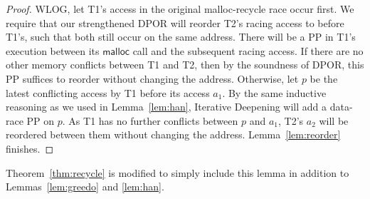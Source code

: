 \begin{proof}
WLOG, let T1's access in the original malloc-recycle race occur first.
We require that our strengthened DPOR will reorder T2's racing access to before T1's, such that both still occur on the same address.
There will be a PP in T1's execution between its $\mathsf{malloc}$ call and the subsequent racing access.
If there are no other memory conflicts between T1 and T2, then by the soundness of DPOR, this PP suffices to reorder without changing the address.
Otherwise, let $p$ be the latest conflicting access by T1 before its access $a_1$.
By the same inductive reasoning as we used in Lemma~\ref{lem:han}, Iterative Deepening will add a data-race PP on $p$.
As T1 has no further conflicts between $p$ and $a_1$, T2's $a_2$ will be reordered between them without changing the address.
Lemma~\ref{lem:reorder} finishes.
\end{proof}

Theorem~\ref{thm:recycle} is modified to simply include this lemma in addition to Lemmas~\ref{lem:greedo} and \ref{lem:han}.

